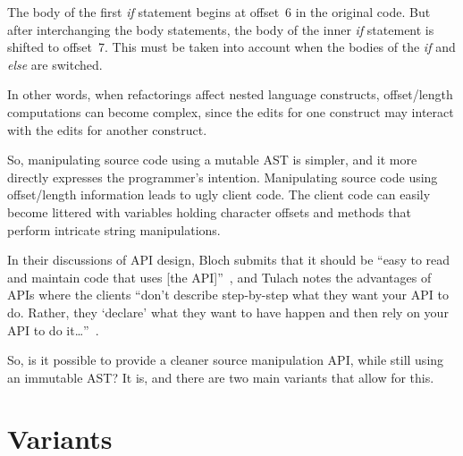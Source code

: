 \documentclass[prodmode]{acmlarge}
\begin{document}
\noindent
The body of the first \textit{if} statement begins at offset~6 in the original
code.  But after interchanging the body statements, the body of
the inner \textit{if} statement is shifted to offset~7. This must be taken into
account when the bodies of the \textit{if} and \textit{else} are switched.

In other words, when refactorings affect nested language constructs,
offset/length computations can become complex, since the edits for one
construct may interact with the edits for another construct.

So, manipulating source code using a mutable AST is simpler, and it more
directly expresses the programmer's intention.  Manipulating source code using
offset/length information leads to ugly client code.  The client code can
easily become littered with variables holding character offsets and methods
that perform intricate string manipulations.

In their discussions of API design, Bloch submits that it should be ``easy to
read and maintain code that uses [the API]''~\cite{bloch}, and Tulach notes the
advantages of APIs where the clients ``don't describe step-by-step what they
want your API to do.  Rather, they `declare' what they want to have happen and
then rely on your API to do it\dots''~\cite[p.~225]{tulach08practical}.

So, is it possible to provide a cleaner source manipulation API, while still
using an immutable AST?  It is, and there are two main variants that allow
for this.


\section{Variants}
\end{document}
